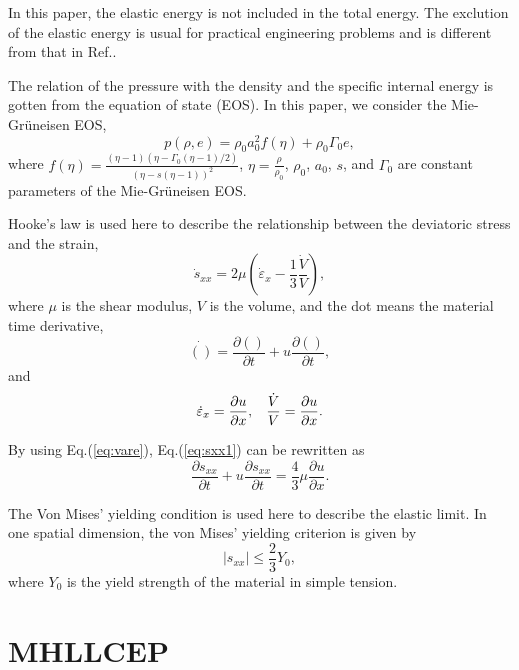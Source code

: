 \documentclass{article}
\numberwithin{equation}{section}
\numberwithin{table}{section}
\begin{document}
In this paper, the elastic energy is not included in the total energy. The exclution of the elastic energy is usual for practical engineering problems \cite{maire2013nominally} and is different from that in Ref.\cite{gavrilyuk2008modelling}.

The relation of the pressure with  the density and the specific internal energy is gotten from the equation of state (EOS). In this paper, we consider the Mie-Gr\"uneisen EOS,
\begin{equation}\label{eq:mie}
  p(\rho,e) = \rho_0 a_0^2f(\eta)+ \rho_0 \Gamma_0 e,
\end{equation}
where $f(\eta) = \frac{(\eta-1)(\eta-\Gamma_0(\eta-1)/2)}{(\eta-s(\eta-1))^2}$, $\eta = \frac{\rho}{\rho_0}$, $\rho_0$, $a_0$, $s$, and $\Gamma_0$ are constant parameters of the Mie-Gr\"uneisen EOS.

Hooke's law is used here to describe the relationship between the deviatoric stress and the strain,
\begin{equation}\label{eq:sxx1}
\dot{s}_{xx} = 2\mu \left(\dot{\varepsilon}_x-\frac{1}{3}\frac{\dot{V}}{V}\right),
\end{equation}
where $\mu$ is the shear modulus, $V$ is the volume, and the dot means the material time derivative,
\begin{equation}\label{eq:mt}
  \dot{()} = \frac{\partial ()}{\partial t} + u \frac{\partial ()}{\partial t},
\end{equation}
and
\begin{equation}\label{eq:vare}
  \dot{\varepsilon}_x = \frac{\partial u}{\partial x}, \hspace{0.3cm} \frac{\dot{V}}{V} = \frac{\partial u}{\partial x}.
\end{equation}

By using Eq.(\ref{eq:vare}), Eq.(\ref{eq:sxx1}) can be rewritten as
\begin{equation}\label{eq:sxx}
  \frac{\partial s_{xx}}{\partial t} + u \frac{\partial s_{xx}}{\partial t} =\frac{4}{3}\mu \frac{\partial u}{\partial x}.
\end{equation}

The Von Mises' yielding condition is used here to describe the elastic limit. In one spatial dimension, the von Mises' yielding criterion is given by
\begin{equation}
  |s_{xx}| \le \frac{2}{3}Y_0,
\end{equation}
where $Y_0$ is the yield strength of the material in simple tension.

\section{MHLLCEP}\label{sec:HLLCEP}
\end{document}
